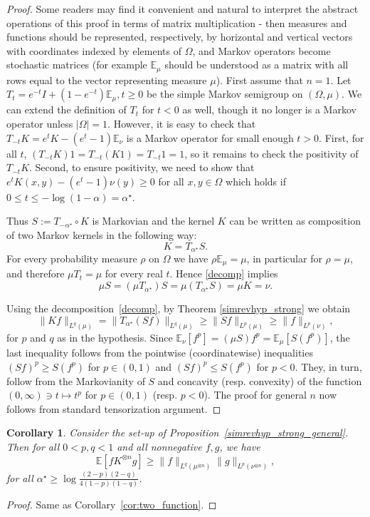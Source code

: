 \documentclass[11pt]{amsart}
\newcommand{\E}{\mathbb{E}}
\newcommand{\gas}{\alpha^{\star}}
\newcommand{\1}{\mathbf{1}}
\def\E{{\mathbb E}}
\theoremstyle{definition}
\theoremstyle{plain}
\newtheorem{corollary}[example]{Corollary}
\theoremstyle{remark}
\numberwithin{equation}{section}
\begin{document}
\begin{proof}
Some readers may find it convenient and natural to interpret the abstract operations of this proof in terms of
matrix multiplication - then measures and functions should be represented, respectively, by horizontal and
vertical vectors with coordinates indexed by elements of $\Omega$, and Markov operators become stochastic
matrices (for example $\E_{\mu}$ should be understood as a matrix with all rows equal to the vector representing
measure $\mu$). First assume that $n=1$. Let $T_t = e^{-t} I + (1-e^{-t}) \E_\mu,  t \ge 0 $ be the simple Markov semigroup on  $(\Omega, \mu)$.
We can extend the definition of $T_t$ for $t <0$ as well,
though it no longer is a Markov operator unless $|\Omega|=1$.
However, it is easy to check that $T_{-t} K = e^t K - (e^t-1) \E_\nu$ is a Markov operator for small enough $t >0$.
First, for all $t$, $(T_{-t}K)1=T_{-t}(K1)=T_{-t}1=1$, so it remains to check the positivity of $T_{-t} K$.
Second, to ensure positivity, we need to show that $ e^t K(x, y)  - (e^t - 1) \nu(y) \ge 0$
for all $x, y \in \Omega$ which holds if $0 \le  t \le -\log(1-\alpha) = \gas$.

Thus $S := T_{-\gas} \circ K$ is Markovian and the kernel $K$ can be written as composition of two Markov
kernels in the  following way:
\begin{equation} \label{decomp}
 K = T_{\gas}S.
 \end{equation}
For every probability measure $\rho$ on $\Omega$ we have $\rho \E_{\mu}=\mu$, in particular for $\rho=\mu$, and
therefore $\mu T_{t}=\mu$ for every real $t$. Hence \eqref{decomp} implies
\[
\mu S = (\mu T_{\gas})S  = \mu (T_{\gas}S) = \mu K  = \nu.
\]

Using the decomposition~\eqref {decomp}, by Theorem \ref{simrevhyp_strong} we obtain
\[
\| K f\|_{L^q(\mu)} = \| T_{\gas}(Sf)\|_{L^{q}(\mu)}
\ge  \| S f\|_{L^p(\mu)} \geq  \| f\|_{L^p(\nu)},
\]
for $p$ and $q$ as  in the hypothesis.
Since $\E_{\nu}[f^{p}]=(\mu S)f^{p}=\E_{\mu}[S(f^{p})]$,
the last inequality follows from the pointwise (coordinatewise) inequalities
$(Sf)^{p} \geq S(f^{p})$ for $p \in (0,1)$ and $(Sf)^{p} \leq S(f^{p})$ for $p<0$.
They, in turn, follow from the Markovianity of $S$ and concavity (resp. convexity) of the function
$(0,\infty) \ni t \mapsto t^{p}$ for $p \in (0,1)$ (resp. $p<0$).
The proof for general $n$ now follows from standard tensorization argument.
\end{proof}

\begin{corollary}\label{cor:two_function_general}
Consider the set-up of Proposition~\ref{simrevhyp_strong_general}. Then for all $0 <p, q<1$ and all nonnegative
$f, g$, we have
\[ \E [f K^{\otimes n} g] \ge \|f \|_{L^q(\mu^{\otimes n})} \|g \|_{L^p(\nu^{\otimes n})}, \]
for all $\gas \geq \log \frac{(2-p)(2-q)}{4(1-p)(1-q)}$.
\end{corollary}
\begin{proof}
Same as Corollary~\ref{cor:two_function}.
\end{proof}
\end{document}
